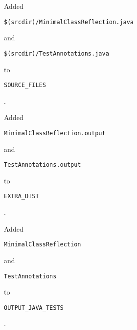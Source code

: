 \documentclass[a4paper, 10pt, titlepage]{scrartcl} %
\begin{document}
Added \begin{scriptsize}\verb||\hspace{0.0pt}\verb|$|\hspace{0.0pt}\verb||\hspace{0.0pt}\verb|(|\hspace{0.0pt}\verb|srcdir|\hspace{0.0pt}\verb|)|\hspace{0.0pt}\verb||\hspace{0.0pt}\verb|/|\hspace{0.0pt}\verb|MinimalClassReflection|\hspace{0.0pt}\verb|.|\hspace{0.0pt}\verb|java|\end{scriptsize} and
\begin{scriptsize}\verb||\hspace{0.0pt}\verb|$|\hspace{0.0pt}\verb||\hspace{0.0pt}\verb|(|\hspace{0.0pt}\verb|srcdir|\hspace{0.0pt}\verb|)|\hspace{0.0pt}\verb||\hspace{0.0pt}\verb|/|\hspace{0.0pt}\verb|TestAnnotations|\hspace{0.0pt}\verb|.|\hspace{0.0pt}\verb|java|\end{scriptsize} to \begin{scriptsize}\verb|SOURCE_FILES|\end{scriptsize}.

Added \begin{scriptsize}\verb|MinimalClassReflection|\hspace{0.0pt}\verb|.|\hspace{0.0pt}\verb|output|\end{scriptsize} and \begin{scriptsize}\verb|TestAnnotations|\hspace{0.0pt}\verb|.|\hspace{0.0pt}\verb|output|\end{scriptsize} to
\begin{scriptsize}\verb|EXTRA_DIST|\end{scriptsize}.

Added \begin{scriptsize}\verb|MinimalClassReflection|\end{scriptsize} and \begin{scriptsize}\verb|TestAnnotations|\end{scriptsize} to
\begin{scriptsize}\verb|OUTPUT_JAVA_TESTS|\end{scriptsize}.
\end{document}
